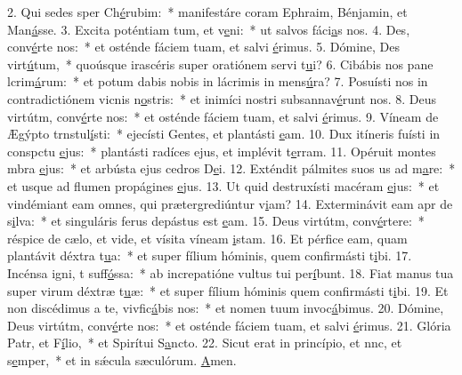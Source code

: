 2. Qui sedes sper Ch\uline{é}rubim:~* manifestáre coram Ephraim, Bénjamin, et Man\uline{á}sse.
3. Excita poténtiam tum, et v\uline{e}ni:~* ut salvos fáci\uline{a}s nos.
4. Des, conv\uline{é}rte nos:~* et osténde fáciem tuam, et salvi \uline{é}rimus.
5. Dómine, Des virt\uline{ú}tum,~* quoúsque irascéris super oratiónem servi t\uline{u}i?
6. Cibábis nos pane lcrim\uline{á}rum:~* et potum dabis nobis in lácrimis in mens\uline{ú}ra?
7. Posuísti nos in contradictiónem vicnis n\uline{o}stris:~* et inimíci nostri subsannav\uline{é}runt nos.
8. Deus virtútm, conv\uline{é}rte nos:~* et osténde fáciem tuam, et salvi \uline{é}rimus.
9. Víneam de Ægýpto trnstul\uline{í}sti:~* ejecísti Gentes, et plantásti \uline{e}am.
10. Dux itíneris fuísti in conspctu \uline{e}jus:~* plantásti radíces ejus, et implévit t\uline{e}rram.
11. Opéruit montes mbra \uline{e}jus:~* et arbústa ejus cedros D\uline{e}i.
12. Exténdit pálmites suos us ad m\uline{a}re:~* et usque ad flumen propágines \uline{e}jus.
13. Ut quid destruxísti macéram \uline{e}jus:~* et vindémiant eam omnes, qui prætergrediúntur v\uline{i}am?
14. Exterminávit eam apr de s\uline{i}lva:~* et singuláris ferus depástus est \uline{e}am.
15. Deus virtútm, conv\uline{é}rtere:~* réspice de cælo, et vide, et vísita víneam \uline{i}stam.
16. Et pérfice eam, quam plantávit déxtra t\uline{u}a:~* et super fílium hóminis, quem confirmásti t\uline{i}bi.
17. Incénsa igni, t suff\uline{ó}ssa:~* ab increpatióne vultus tui per\uline{í}bunt.
18. Fiat manus tua super virum déxtræ t\uline{u}æ:~* et super fílium hóminis quem confirmásti t\uline{i}bi.
19. Et non discédimus a te, vivfic\uline{á}bis nos:~* et nomen tuum invoc\uline{á}bimus.
20. Dómine, Deus virtútm, conv\uline{é}rte nos:~* et osténde fáciem tuam, et salvi \uline{é}rimus.
21. Glória Patr, et F\uline{í}lio,~* et Spirítui S\uline{a}ncto.
22. Sicut erat in princípio, et nnc, et s\uline{e}mper,~* et in sǽcula sæculórum. \uline{A}men.

